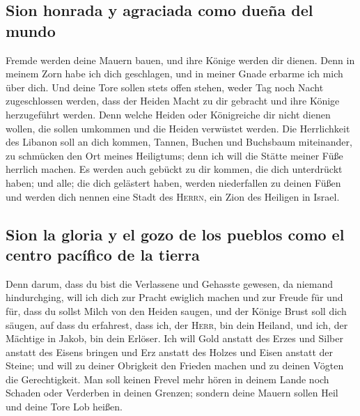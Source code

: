 \hypertarget{sion-honrada-y-agraciada-como-dueuxf1a-del-mundo}{%
\subsection{Sion honrada y agraciada como dueña del
mundo}\label{sion-honrada-y-agraciada-como-dueuxf1a-del-mundo}}

 Fremde werden deine Mauern bauen, und ihre Könige werden
dir dienen. Denn in meinem Zorn habe ich dich geschlagen, und in meiner
Gnade erbarme ich mich über dich.  Und deine Tore sollen
stets offen stehen, weder Tag noch Nacht zugeschlossen werden, dass der
Heiden Macht zu dir gebracht und ihre Könige herzugeführt werden.
 Denn welche Heiden oder Königreiche dir nicht dienen
wollen, die sollen umkommen und die Heiden verwüstet werden.
 Die Herrlichkeit des Libanon soll an dich kommen,
Tannen, Buchen und Buchsbaum miteinander, zu schmücken den Ort meines
Heiligtums; denn ich will die Stätte meiner Füße herrlich machen.
 Es werden auch gebückt zu dir kommen, die dich
unterdrückt haben; und alle; die dich gelästert haben, werden
niederfallen zu deinen Füßen und werden dich nennen eine Stadt des
\textsc{Herrn}, ein Zion des Heiligen in Israel.

\hypertarget{sion-la-gloria-y-el-gozo-de-los-pueblos-como-el-centro-pacuxedfico-de-la-tierra}{%
\subsection{Sion la gloria y el gozo de los pueblos como el centro
pacífico de la
tierra}\label{sion-la-gloria-y-el-gozo-de-los-pueblos-como-el-centro-pacuxedfico-de-la-tierra}}

 Denn darum, dass du bist die Verlassene und Gehasste
gewesen, da niemand hindurchging, will ich dich zur Pracht ewiglich
machen und zur Freude für und für,  dass du sollst Milch
von den Heiden saugen, und der Könige Brust soll dich säugen, auf dass
du erfahrest, dass ich, der \textsc{Herr}, bin dein Heiland, und ich,
der Mächtige in Jakob, bin dein Erlöser.  Ich will Gold
anstatt des Erzes und Silber anstatt des Eisens bringen und Erz anstatt
des Holzes und Eisen anstatt der Steine; und will zu deiner Obrigkeit
den Frieden machen und zu deinen Vögten die Gerechtigkeit.
 Man soll keinen Frevel mehr hören in deinem Lande noch
Schaden oder Verderben in deinen Grenzen; sondern deine Mauern sollen
Heil und deine Tore Lob heißen.

